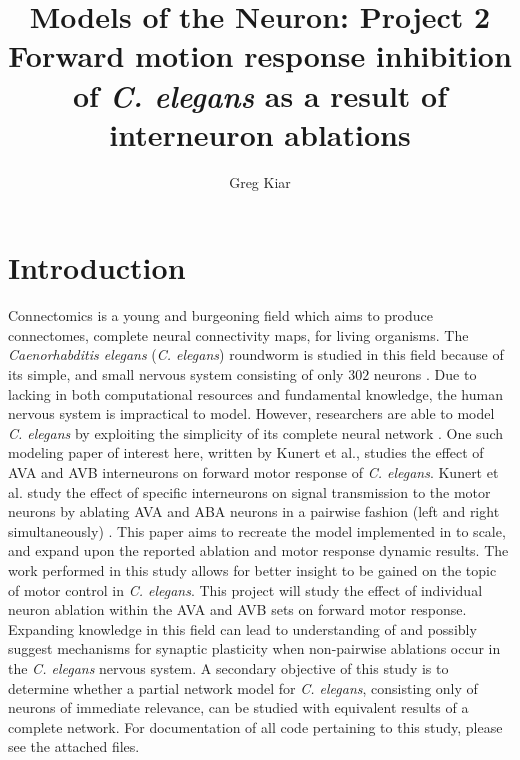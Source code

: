 \documentclass[11pt]{article} %
\title{Models of the Neuron: Project 2 \\ Forward motion response inhibition of \emph{C. elegans} as a result of interneuron ablations}
\author{Greg Kiar}
\begin{document}
\maketitle

\section{Introduction}

Connectomics is a young and burgeoning field which aims to produce connectomes, complete neural connectivity maps, for living organisms. The \emph{Caenorhabditis elegans} (\emph{C. elegans}) roundworm is studied in this field because of its simple, and small nervous system consisting of only $302$ neurons \cite{Sulston1977,White1986,Dunn2003, Chen2006}. Due to lacking in both computational resources and fundamental knowledge, the human nervous system is impractical to model. However, researchers are able to model \emph{C. elegans} by exploiting the simplicity of its complete neural network \cite{Iwasaki2006, Iwasaki2004, Dunn2003, Wicks1996a}. One such modeling paper of interest here, written by Kunert et al.\cite{Kunert2014}, studies the effect of AVA and AVB interneurons on forward motor response of \emph{C. elegans}. Kunert et al. study the effect of specific interneurons on signal transmission to the motor neurons by ablating AVA and ABA neurons in a pairwise fashion (left and right simultaneously) \cite{Kunert2014}. This paper aims to recreate the model implemented in \cite{Kunert2014} to scale, and expand upon the reported ablation and motor response dynamic results. The work performed in this study allows for better insight to be gained on the topic of motor control in \emph{C. elegans}. This project will study the effect of individual neuron ablation within the AVA and AVB sets on forward motor response. Expanding knowledge in this field can lead to understanding of and possibly suggest mechanisms for synaptic plasticity when non-pairwise ablations occur in the \emph{C. elegans} nervous system. A secondary objective of this study is to determine whether a partial network model for \emph{C. elegans}, consisting only of neurons of immediate relevance, can be studied with equivalent results of a complete network. For documentation of all code pertaining to this study, please see the attached files.
\end{document}
